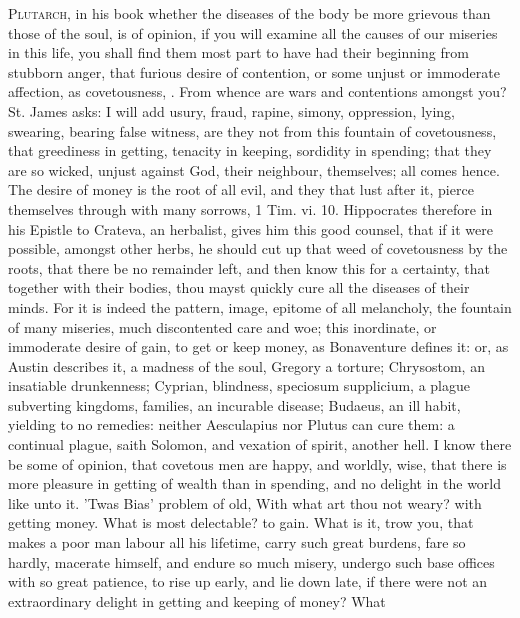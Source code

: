{\lettrine{P}{lutarch}, in his book whether the diseases of the body be more
grievous than those of the soul, is of opinion, if you will examine all
the causes of our miseries in this life, you shall find them most part
to have had their beginning from stubborn anger, that furious desire of
contention, or some unjust or immoderate affection, as covetousness,
\etc{}. From whence are wars and contentions amongst you? St. James
asks: I will add usury, fraud, rapine, simony, oppression, lying,
swearing, bearing false witness, \etc{} are they not from this fountain of
covetousness, that greediness in getting, tenacity in keeping,
sordidity in spending; that they are so wicked, unjust against
God, their neighbour, themselves; all comes hence. The desire of money
is the root of all evil, and they that lust after it, pierce themselves
through with many sorrows, 1 Tim. vi. 10. Hippocrates therefore in his
Epistle to Crateva, an herbalist, gives him this good counsel, that if
it were possible,  amongst other herbs, he should cut up that
weed of covetousness by the roots, that there be no remainder left, and
then know this for a certainty, that together with their bodies, thou
mayst quickly cure all the diseases of their minds. For it is indeed
the pattern, image, epitome of all melancholy, the fountain of many
miseries, much discontented care and woe; this inordinate, or
immoderate desire of gain, to get or keep money, as Bonaventure
defines it: or, as Austin describes it, a madness of the soul, Gregory
a torture; Chrysostom, an insatiable drunkenness; Cyprian, blindness,
speciosum supplicium, a plague subverting kingdoms, families, an
incurable disease; Budaeus, an ill habit, yielding to no
remedies: neither Aesculapius nor Plutus can cure them: a continual
plague, saith Solomon, and vexation of spirit, another hell. I know
there be some of opinion, that covetous men are happy, and worldly,
wise, that there is more pleasure in getting of wealth than in
spending, and no delight in the world like unto it. 'Twas Bias'
problem of old, With what art thou not weary? with getting money. What
is most delectable? to gain. What is it, trow you, that makes a poor
man labour all his lifetime, carry such great burdens, fare so hardly,
macerate himself, and endure so much misery, undergo such base offices
with so great patience, to rise up early, and lie down late, if there
were not an extraordinary delight in getting and keeping of money? What
}
